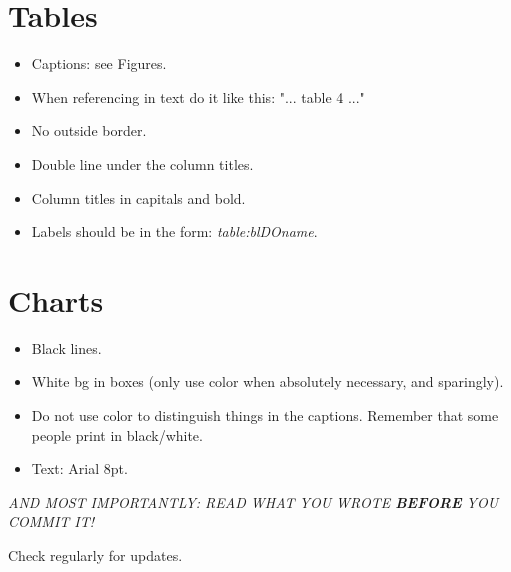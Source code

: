 \documentclass[11pt, a4paper ]{article}
\begin{document}
\section{Tables}
\begin{itemize}
	\item Captions: see Figures.
	\item When referencing in text do it like this: "... table 4 ..."
	\item No outside border.
	\item Double line under the column titles.
	\item Column titles in capitals and bold.
	\item Labels should be in the form: \emph{table:blDOname}.
\end{itemize}
\section{Charts}
\begin{itemize}
	\item Black lines.
	\item White bg in boxes (only use color when absolutely necessary, and sparingly).
	\item Do not use color to distinguish things in the captions. Remember that some people print in black/white.
	\item Text: Arial 8pt.
\end{itemize}

\emph{AND MOST IMPORTANTLY: READ WHAT YOU WROTE \textbf{BEFORE} YOU COMMIT IT!}

Check regularly for updates.
\end{document}
